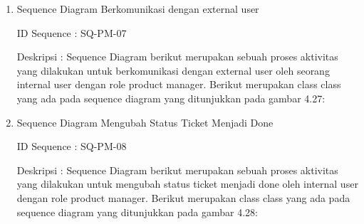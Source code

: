 \documentclass[12pt]{article}
\begin{document}
\begin{enumerate}[label=\textbf{4.\arabic*.}]
\begin{enumerate}[label=\textbf{4.1.\arabic*.}, wide, labelwidth=!, labelindent=0pt]
\begin{enumerate}[label=\textbf{4.1.7.\arabic*.}, wide, labelwidth=!, labelindent=0pt]
\begin{enumerate}[label=\arabic*.]
            
                
                \item Sequence Diagram Berkomunikasi dengan external user
                
                \noindent ID Sequence	: SQ-PM-07
                
                \noindent Deskripsi	: Sequence Diagram berikut merupakan sebuah proses aktivitas yang dilakukan untuk berkomunikasi dengan external user oleh seorang internal user dengan role product manager. Berikut merupakan class class yang ada pada sequence diagram yang ditunjukkan pada gambar 4.27:
                


                \item Sequence Diagram Mengubah Status Ticket Menjadi Done
                
                \noindent ID Sequence	: SQ-PM-08
                
                \noindent Deskripsi	: Sequence Diagram berikut merupakan sebuah proses aktivitas yang dilakukan untuk mengubah status ticket menjadi done oleh internal user dengan role product manager. Berikut merupakan class class yang ada pada sequence diagram yang ditunjukkan pada gambar 4.28:
                
            

\end{enumerate}
\end{enumerate}
\end{enumerate}
\end{enumerate}
\end{document}
